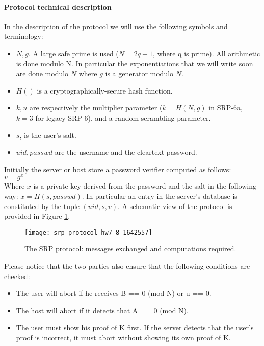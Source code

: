 \documentclass[11pt]{article}
\begin{document}
\paragraph*{Protocol technical description}
In the description of the protocol we will use the following symbols and terminology:
\begin{itemize}
  \item $N, g$. A large safe prime is used ($N = 2q+1$, where q is prime). All arithmetic is done modulo N. In particular the exponentiations that we will write soon are done modulo $N$ where $g$ is a generator modulo $N$.
  \item $H()$ is a cryptographically-secure hash function.
  \item $k, u$ are respectively the multiplier parameter ($k = H(N, g)$ in SRP-6a, $k = 3$ for legacy SRP-6), and a random scrambling parameter.
  \item $s$, is the user's salt.
  \item $uid, passwd$  are the username and the cleartext password.
\end{itemize}
Initially the server or host store a password verifier computed as follows:\\

  $v = g^x$ \\
  
Where $x$ is a private key derived from the password and the salt in the following way: $x = H(s, passwd)$. In particular an entry in the server's database is constituted by the tuple $(uid, s, v)$.
A schematic view of the protocol is provided in Figure \ref{fig:protocol}.

\begin{figure}[h]
\texttt{[image: srp-protocol-hw7-8-1642557]}
\centering
\caption{The SRP protocol: messages exchanged and computations required.}
\label{fig:protocol}
\end{figure}

Please notice that the two parties also ensure that the following conditions are checked:
\begin{itemize}
	\item The user will abort if he receives B == 0 (mod N) or u == 0.
	\item The host will abort if it detects that A == 0 (mod N).
	\item The user must show his proof of K first. If the server detects that the user's proof is incorrect, it must abort without showing its own proof of K.
\end{itemize}
\end{document}
